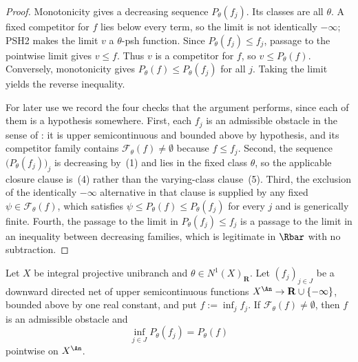 \begin{proof}
Monotonicity gives a decreasing sequence $P_\theta(f_j)$.
Its classes are all $\theta$.
A fixed competitor for $f$ lies below every term, so the limit is not
identically $-\infty$; PSH2 makes the limit $v$ a
$\theta$-psh function.
Since $P_\theta(f_j)\le f_j$, passage to the pointwise limit gives
$v\le f$.
Thus $v$ is a competitor for $f$, so $v\le P_\theta(f)$.
Conversely, monotonicity gives
$P_\theta(f)\le P_\theta(f_j)$ for all $j$.
Taking the limit yields the reverse inequality.

For later use we record the four checks that the argument performs, since
each of them is a hypothesis somewhere.  First, each $f_j$ is an
admissible obstacle in the sense of
: it is upper semicontinuous and bounded
above by hypothesis, and its competitor family contains
$\mathcal F_\theta(f)\ne\emptyset$ because $f\le f_j$.  Second, the sequence
$\bigl(P_\theta(f_j)\bigr)_j$ is decreasing by
\,(1) and lies in the fixed class
$\theta$, so the applicable closure clause is
\,(4) rather than the varying-class
clause~(5).  Third, the exclusion of the identically $-\infty$
alternative in that clause is supplied by any fixed
$\psi\in\mathcal F_\theta(f)$, which satisfies $\psi\le P_\theta(f)\le
P_\theta(f_j)$ for every $j$ and is generically finite.  Fourth, the
passage to the limit in $P_\theta(f_j)\le f_j$ is a passage to the limit
in an inequality between decreasing families, which is legitimate in
$\Rbar$ with no subtraction.
\end{proof}

\begin{theorem}
\label{thm:ch45-decreasing-obstacle-nets}
Let $X$ be integral projective unibranch and
$\theta\in N^1(X)_{\mathbf R}$.  Let $(f_j)_{j\in J}$ be a downward
directed net of upper semicontinuous functions
$X^{\An}\to\mathbf R\cup\{-\infty\}$, bounded above by one real constant,
and put $f:=\inf_jf_j$.  If $\mathcal F_\theta(f)\ne\emptyset$, then $f$ is an
admissible obstacle and
\[
 \inf_{j\in J}P_\theta(f_j)=P_\theta(f)
\]
pointwise on $X^{\An}$.
\end{theorem}

